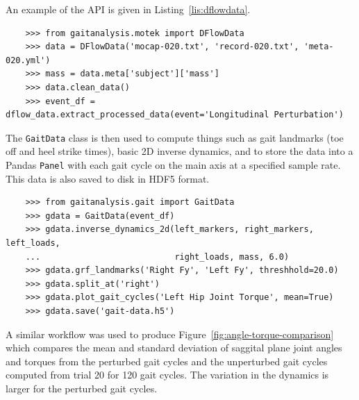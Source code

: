 \documentclass[10pt,a4paper,twocolumn]{article}
\begin{document}
An example of the API is given in Listing~\ref{lis:dflowdata}.

\begin{listing*}
  \begin{verbatim}
    >>> from gaitanalysis.motek import DFlowData
    >>> data = DFlowData('mocap-020.txt', 'record-020.txt', 'meta-020.yml')
    >>> mass = data.meta['subject']['mass']
    >>> data.clean_data()
    >>> event_df = dflow_data.extract_processed_data(event='Longitudinal Perturbation')
  \end{verbatim}
  \cprotect\caption{Python interpreter session showing how one could load a
    trial into memory, extract the subject's mass from the meta data, run the
    data cleaning process, and finally extract a Pandas \verb|DataFrame|
    containing all of the time histories for a specific event in the trial.}
  \label{lis:dflowdata}
\end{listing*}

The \verb|GaitData| class is then used to compute things such as gait landmarks
(toe off and heel strike times), basic 2D inverse dynamics, and to store the
data into a Pandas \verb|Panel| with each gait cycle on the main axis at a
specified sample rate. This data is also saved to disk in HDF5 format.

\begin{listing*}
  \begin{verbatim}
    >>> from gaitanalysis.gait import GaitData
    >>> gdata = GaitData(event_df)
    >>> gdata.inverse_dynamics_2d(left_markers, right_markers, left_loads,
    ...                           right_loads, mass, 6.0)
    >>> gdata.grf_landmarks('Right Fy', 'Left Fy', threshhold=20.0)
    >>> gdata.split_at('right')
    >>> gdata.plot_gait_cycles('Left Hip Joint Torque', mean=True)
    >>> gdata.save('gait-data.h5')
  \end{verbatim}
  \cprotect\caption{Python interpreter session showing how one could compute
    the inverse dynamics (joint angles and torques), indentify the gait
    landmarks (e.g. heelstrikes), split the data with respect to the gait
    landmarks in a Pandas \verb|Panel|, plot the mean and standard deviation of
    one time history with respect to the gait cycles, and save the data to disk.}
  \label{lis:dflowdata}
\end{listing*}

A similar workflow was used to produce Figure~\ref{fig:angle-torque-comparison}
which compares the mean and standard deviation of saggital plane joint angles
and torques from the perturbed gait cycles and the unperturbed gait cycles
computed from trial 20 for 120 gait cycles. The variation in the dynamics is
larger for the perturbed gait cycles.
\end{document}

